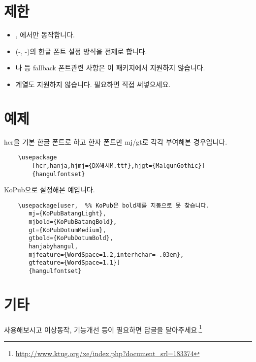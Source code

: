 \documentclass[b5paper,nanum]{oblivoir}
\begin{document}
\section{제한}
\begin{itemize} \tightlist
\item {}, 에서만 동작합니다.
\item \koTeX (-\ko, -\ko)의 한글 폰트 설정 방식을 전제로 합니다.
\item {}나  등 fallback 폰트관련 사항은 이 패키지에서 지원하지 않습니다.
\item {} 계열도 지원하지 않습니다. 필요하면 직접 써넣으세요.
\end{itemize}

\section{예제}

hcr을 기본 한글 폰트로 하고 한자 폰트만 mj/gt로 각각 부여해본 경우입니다.
\begin{verbatim}
    \usepackage
        [hcr,hanja,hjmj={DX해서M.ttf},hjgt={MalgunGothic}]
        {hangulfontset}
\end{verbatim}

\noindent KoPub으로 설정해본 예입니다.
\begin{verbatim}
    \usepackage[user,  %% KoPub은 bold체를 지동으로 못 찾습니다.
       mj={KoPubBatangLight},
       mjbold={KoPubBatangBold},
       gt={KoPubDotumMedium},
       gtbold={KoPubDotumBold},
       hanjabyhangul,
       mjfeature={WordSpace=1.2,interhchar=-.03em},
       gtfeature={WordSpace=1.1}]
       {hangulfontset}
\end{verbatim}

\section{기타}
사용해보시고 이상동작, 기능개선 등이 필요하면 답글을 달아주세요.\footnote{%
	\url{http://www.ktug.org/xe/index.php?document_srl=183374}
}
\end{document}
